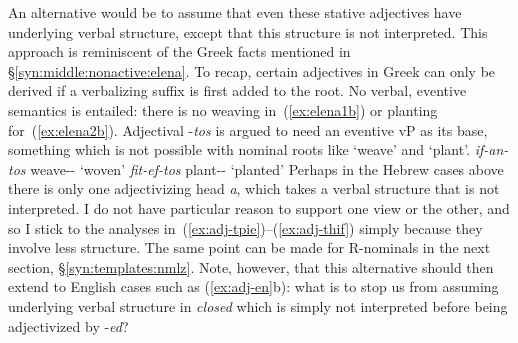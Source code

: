 {An alternative would be to assume that even these stative adjectives have underlying verbal structure, except that this structure is not interpreted. This approach is reminiscent of the Greek facts mentioned in \S\ref{syn:middle:nonactive:elena}. To recap, certain adjectives in Greek can only be derived if a verbalizing suffix is first added to the root. No verbal, eventive semantics is entailed: there is no weaving in~(\ref{ex:elena1b}) or planting for~(\ref{ex:elena2b}). Adjectival -\emph{tos} is argued to need an eventive vP as its base, something which is not possible with nominal roots like `weave' and `plant'.}
\ex \label{ex:elena1b} \emph{if-an-tos} weave-- `woven'
\xe
\ex \label{ex:elena2b} \emph{fit-ef-tos} plant-- `planted' \hfill \citep[97]{elenasamioti14}
\xe
{Perhaps in the Hebrew cases above there is only one adjectivizing head \emph{a}, which takes a verbal structure that is not interpreted. I do not have particular reason to support one view or the other, and so I stick to the analyses in~(\ref{ex:adj-tpie})--(\ref{ex:adj-thif}) simply because they involve less structure. The same point can be made for R-nominals in the next section, \S\ref{syn:templates:nmlz}. Note, however, that this alternative should then extend to English cases such as (\ref{ex:adj-en}b): what is to stop us from assuming underlying verbal structure in \emph{closed} which is simply not interpreted before being adjectivized by -\emph{ed}?}

